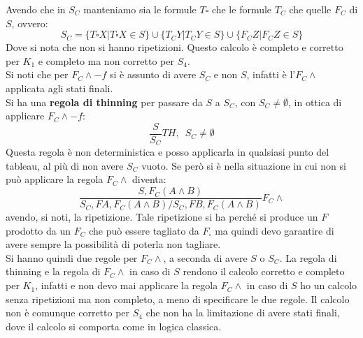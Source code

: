 \documentclass[a4paper,12pt, oneside]{book}
\begin{document}
Avendo che in $S_C$ manteniamo sia le formule $T\square$ che le formule $T_C$
che quelle $F_C$ di $S$, ovvero:
\[S_C=\{T\square X|T\square X\in S\}\cup\{T_CY|T_CY\in S\}
  \cup\{F_CZ|F_CZ\in S\}\] 
Dove si nota che non si hanno ripetizioni. Questo calcolo è completo e corretto
per $K_1$ e completo ma non corretto per $S_4$.\\
Si noti che per $F_C\land -f$ si è assunto di avere $S_C$ e non $S$, infatti è
l'$F_C\land$ applicata agli stati finali.\\
Si ha una \textbf{regola di thinning} per passare da $S$ a $S_C$, con $S_C\neq
\emptyset$, in ottica di applicare $F_C\land -f$:
\[\frac{S}{S_C}TH,\,\,\,S_C\neq \emptyset\]
Questa regola è non
deterministica e posso applicarla in qualsiasi punto del tableau, al più di non
avere $S_C$ vuoto. Se però si è
nella situazione in cui non si può applicare la regola $F_C\land$ diventa:
\[\frac{S,F_C(A\land B)}{S_C,FA,F_C(A\land B)/S_C,FB,F_C(A\land B)}F_C\land\]
avendo, si noti, la ripetizione. Tale ripetizione si ha perché si produce un $F$
prodotto da un $F_C$ che può essere tagliato da $F_\square$ ma quindi devo
garantire di avere sempre la possibilità di poterla non tagliare.\\
Si hanno quindi due regole per $F_C\land$, a
seconda di avere $S$ o $S_C$. La regola di thinning e la regola di $F_C\land$ in
caso di $S$ rendono il calcolo corretto e completo per $K_1$, infatti e non devo
mai applicare la regola $F_C\land$ in caso di $S$ ho un calcolo senza
ripetizioni ma non completo, a meno di specificare le due regole. Il calcolo non
è comunque corretto per $S_4$ che non ha la limitazione di avere stati finali,
dove il calcolo si comporta come in logica classica.
\newpage
\end{document}
